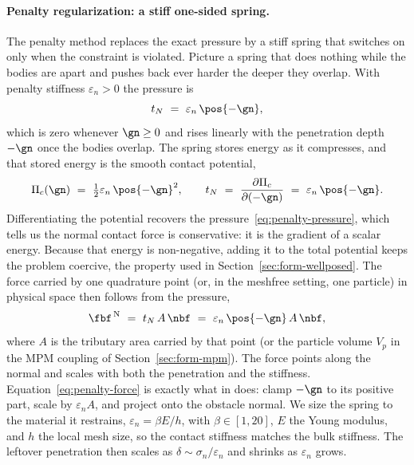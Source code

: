 \paragraph{Penalty regularization: a stiff one-sided spring.}
The penalty method replaces the exact pressure by a stiff spring that switches on only when the
constraint is violated. Picture a spring that does nothing while the bodies are apart and pushes back
ever harder the deeper they overlap. With penalty stiffness $\varepsilon_n>0$ the pressure is
\begin{equation}\label{eq:penalty-pressure}
t_N\ =\ \varepsilon_n\,\pos{-\gn},
\end{equation}
which is zero whenever $\gn\ge0$ and rises linearly with the penetration depth $-\gn$ once the bodies
overlap. The spring stores energy as it compresses, and that stored energy is the smooth contact
potential,
\begin{equation}\label{eq:penalty-potential}
\Pi_c(\gn)\ =\ \tfrac{1}{2}\varepsilon_n\,\pos{-\gn}^2,
\qquad
t_N\ =\ \frac{\partial \Pi_c}{\partial(-\gn)}\ =\ \varepsilon_n\,\pos{-\gn} .
\end{equation}
Differentiating the potential recovers the pressure~\eqref{eq:penalty-pressure}, which tells us the
normal contact force is conservative: it is the gradient of a scalar energy. Because that energy is
non-negative, adding it to the total potential keeps the problem coercive, the property used in
Section~\ref{sec:form-wellposed}. The force carried by one quadrature point (or, in the meshfree
setting, one particle) in physical space then follows from the pressure,
\begin{equation}\label{eq:penalty-force}
\fbf^{\,\mathrm{N}}\ =\ t_N\,A\,\nbf\ =\ \varepsilon_n\,\pos{-\gn}\,A\,\nbf ,
\end{equation}
where $A$ is the tributary area carried by that point (or the particle volume $V_p$ in the MPM
coupling of Section~\ref{sec:form-mpm}). The force points along the normal and scales with both the
penetration and the stiffness. Equation~\eqref{eq:penalty-force} is exactly what
 in  does: clamp $-\gn$ to its positive
part, scale by $\varepsilon_n A$, and project onto the obstacle normal. We size the spring to the
material it restrains, $\varepsilon_n=\beta E/h$, with $\beta\in[1,20]$, $E$ the Young modulus, and
$h$ the local mesh size, so the contact stiffness matches the bulk stiffness. The leftover penetration
then scales as $\delta\sim\sigma_n/\varepsilon_n$ and shrinks as $\varepsilon_n$ grows.

